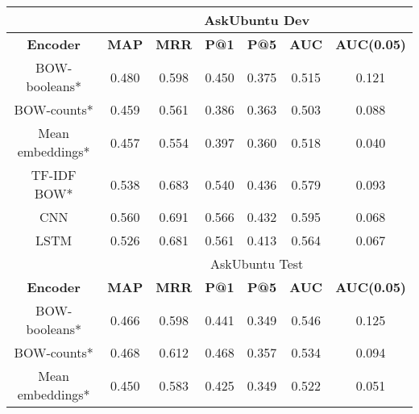 \documentclass[12pt]{article}
\begin{document}
\begin{center}
		\begin{tabular}{|c||c|c|c|c||c|c|}
			\hline
			\cellcolor{gray!15}
				& \multicolumn{6}{c|}{\cellcolor{gray!15}AskUbuntu Dev} \\ \hline
			\cellcolor{gray!15}\textbf{Encoder} & \cellcolor{gray!15}\textbf{MAP} & \cellcolor{gray!15}\textbf{MRR}
				& \cellcolor{gray!15}\textbf{P@1} & \cellcolor{gray!15}\textbf{P@5}
				& \cellcolor{gray!15}\textbf{AUC} & \cellcolor{gray!15}\textbf{AUC(0.05)} \\ \hline\hline
			\cellcolor{red!15}BOW-booleans* & 0.480 & 0.598 & 0.450 & 0.375 & 0.515 & 0.121 \\ \hline
			\cellcolor{red!15}BOW-counts* & 0.459 & 0.561 & 0.386 & 0.363 & 0.503 & 0.088 \\ \hline
			\cellcolor{red!15}Mean embeddings* & 0.457 & 0.554 & 0.397 & 0.360 & 0.518 & 0.040 \\ \hline
			\cellcolor{red!15}TF-IDF BOW* & 0.538 & 0.683 & 0.540 & 0.436 & 0.579 & 0.093 \\ \hline\hline
			\cellcolor{green!15}CNN & 0.560 & 0.691 & 0.566 & 0.432 & 0.595 & 0.068 \\ \hline
			\cellcolor{green!15}LSTM & 0.526 & 0.681 & 0.561 & 0.413 & 0.564 & 0.067 \\ \hline
			\hline
			\cellcolor{gray!15}
				& \multicolumn{6}{c|}{\cellcolor{gray!15}AskUbuntu Test} \\ \hline
			\cellcolor{gray!15}\textbf{Encoder} & \cellcolor{gray!15}\textbf{MAP} & \cellcolor{gray!15}\textbf{MRR}
				& \cellcolor{gray!15}\textbf{P@1} & \cellcolor{gray!15}\textbf{P@5}
				& \cellcolor{gray!15}\textbf{AUC} & \cellcolor{gray!15}\textbf{AUC(0.05)} \\ \hline\hline
			\cellcolor{red!15}BOW-booleans* & 0.466 & 0.598 & 0.441 & 0.349 & 0.546 & 0.125 \\ \hline
			\cellcolor{red!15}BOW-counts* & 0.468 & 0.612 & 0.468 & 0.357 & 0.534 & 0.094 \\ \hline
			\cellcolor{red!15}Mean embeddings* & 0.450 & 0.583 & 0.425 & 0.349 & 0.522 & 0.051 \\ \hline

\end{tabular}
\end{center}
\end{document}
